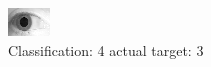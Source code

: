 \begin{figure}[h!]
\begin{center}
\includegraphics[width=0.60\columnwidth]{figures/ID1799_class_4_target_3.png}
\end{center}
\caption{ Classification: 4 actual target: 3}
\label{fig:ID1799_class_4_target_3}
\end{figure}
